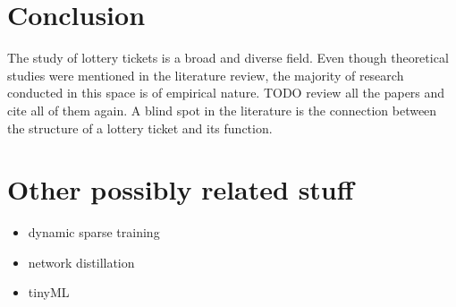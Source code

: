 \section{Conclusion}
The study of lottery tickets is a broad and diverse field. Even though theoretical studies were mentioned in the literature review, the majority of research conducted in this space is of empirical nature.
TODO review all the papers and cite all of them again.
A blind spot in the literature is the connection between the structure of a lottery ticket and its function. 

\section{Other possibly related stuff}
\begin{itemize}
    \item dynamic sparse training
    \item network distillation
    \item tinyML
\end{itemize}




